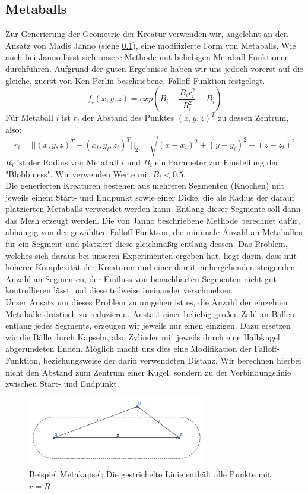 \subsection{Metaballs}
Zur Generierung der Geometrie der Kreatur verwenden wir, angelehnt an den Ansatz von Madis Janno \cite{Janno20182dCG} (siehe \ref{}), eine modifizierte Form von Metaballs. Wie auch bei Janno lässt sich unsere Methode mit beliebigen Metaball-Funktionen durchführen. Aufgrund der guten Ergebnisse haben wir uns jedoch vorerst auf die gleiche, zuerst von Ken Perlin beschriebene, Falloff-Funktion festgelegt.
\[f_i(x,y,z) = exp(B_i - \frac{B_ir_i^2}{R_i^2} - B_i)\]
Für Metaball $i$ ist $r_i$ der Abstand des Punktes $(x,y,z)^T$ zu dessen Zentrum, also: \[r_i=||(x,y,z)^T-(x_i,y_i,z_i)^T||_2=\sqrt{(x-x_i)^2+(y-y_i)^2+(z-z_i)^2}\]
$R_i$ ist der Radius von Metaball $i$ und $B_i$ ein Parameter zur Einstellung der "Blobbiness". Wir verwenden Werte mit $B_i < 0.5$. \\
Die generierten Kreaturen bestehen aus mehreren Segmenten (Knochen) mit jeweils einem Start- und Endpunkt sowie einer Dicke, die als Radius der darauf platzierten Metaballs verwendet werden kann. Entlang dieser Segmente soll dann das Mesh erzeugt werden. Die von Janno beschriebene Methode berechnet dafür, abhängig von der gewählten Falloff-Funktion, die minimale Anzahl an Metabällen für ein Segment und platziert diese gleichmäßig entlang dessen. Das Problem, welches sich daraus bei unseren Experimenten ergeben hat, liegt darin, dass mit höherer Komplexität der Kreaturen und einer damit einhergehenden steigenden Anzahl an Segmenten, der Einfluss von benachbarten Segmenten nicht gut kontrollieren lässt und diese teilweise ineinander verschmelzen. \\

Unser Ansatz um dieses Problem zu umgehen ist es, die Anzahl der einzelnen Metabälle drastisch zu reduzieren. Anstatt einer beliebig großen Zahl an Bällen entlang jedes Segments, erzeugen wir jeweils nur einen einzigen. Dazu ersetzen wir die Bälle durch Kapseln, also Zylinder mit jeweils durch eine Halbkugel abgerundeten Enden. Möglich macht uns dies eine Modifikation der Falloff-Funktion, beziehungsweise der darin verwendeten Distanz. Wir berechnen hierbei nicht den Abstand zum Zentrum einer Kugel, sondern zu der Verbindungslinie zwischen Start- und Endpunkt. \\

\begin{figure}[ht]
\centering
\includegraphics[width=0.7\textwidth]{resources/img/metacapsule.png}
\caption{Beispiel Metakapsel; Die gestrichelte Linie enthält alle Punkte mit $r=R$}
\label{metacapsule}
\end{figure}

